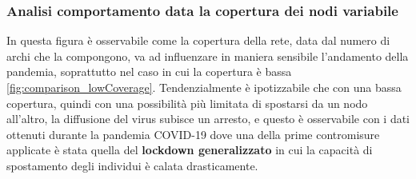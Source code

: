 \subsubsection{Analisi comportamento data la copertura dei nodi variabile}
In questa figura è osservabile come la copertura della rete, data dal numero di archi che la compongono,
va ad influenzare in maniera sensibile l'andamento della pandemia, soprattutto nel caso in cui la copertura è 
bassa \ref{fig:comparison_lowCoverage}. Tendenzialmente è ipotizzabile che con una bassa copertura, quindi 
con una possibilità più limitata di spostarsi da un nodo all'altro, la diffusione del virus subisce un arresto, 
e questo è osservabile con i dati ottenuti durante la pandemia COVID-19 dove una della prime contromisure applicate 
è stata quella del \textbf{lockdown generalizzato} in cui la capacità di spostamento degli individui 
è calata drasticamente.

